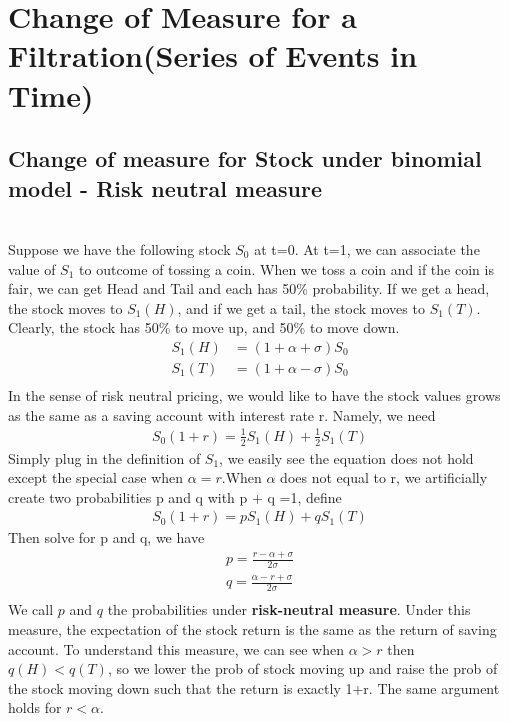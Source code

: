 \documentclass[a4paper]{article}
\begin{document}
\section{Change of Measure for a Filtration(Series of Events in Time)}
\subsection{Change of measure for Stock under binomial model - Risk neutral measure}\\
Suppose we have the following stock $S_0$ at t=0. At t=1, we can associate the value of $S_1$ to outcome of tossing a coin. When we toss a coin and if the coin is fair, we can get Head and Tail and each has 50\% probability. If we get a head, the stock moves to $S_1(H)$, and if we get a tail, the stock moves to $S_1(T)$. Clearly, the stock has 50\% to move up, and 50\% to move down.
\begin{align*}
S_1(H) & = (1+\alpha + \sigma) S_0\\  
S_1(T) & = (1+\alpha - \sigma) S_0\\     
\end{align*}
In the sense of risk neutral pricing, we would like to have the stock values grows as the same as a saving account with interest rate r.  Namely, we need
\begin{align*}
S_0 (1+r) = \frac{1}{2}S_1(H) + \frac{1}{2} S_1(T) 
\end{align*}
Simply plug in the definition of $S_1$, we easily see the equation does not hold except the special case when $\alpha = r$.When $\alpha$ does not equal to r, we artificially create two probabilities p and q with p + q =1, 
define 
\begin{align*}
S_0 (1+r) = p S_1(H) + q S_1(T) 	
\end{align*}
Then solve for p and q, we have
\begin{align*}
p= \frac{r - \alpha + \sigma}{2 \sigma} \\
q= \frac{\alpha - r + \sigma}{2 \sigma} \\
\end{align*}
We call $p$ and $q$ the probabilities under {\bf risk-neutral measure}. Under this measure, the expectation of the stock return is the same as the return of saving account. To understand this measure, we can see when $\alpha > r$ then $q(H)< q(T)$, so we lower the prob of stock moving up and raise the prob of the stock moving down such that the return is exactly 1+r. The same argument holds for $r < \alpha$. 
\end{document}
